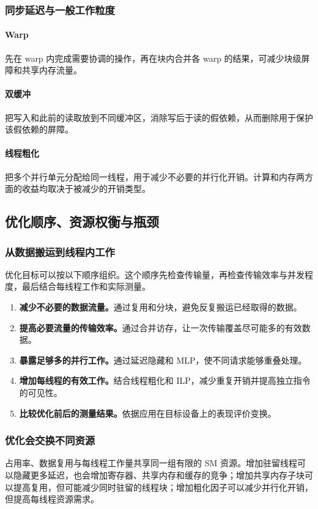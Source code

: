 \subsubsection{同步延迟与一般工作粒度}
\paragraph{Warp }
先在 warp 内完成需要协调的操作，再在块内合并各 warp 的结果，可减少块级屏障和共享内存流量。

\paragraph{双缓冲}
把写入和此前的读取放到不同缓冲区，消除写后于读的假依赖，从而删除用于保护该假依赖的屏障。

\paragraph{线程粗化}
把多个并行单元分配给同一线程，用于减少不必要的并行化开销。计算和内存两方面的收益均取决于被减少的开销类型。

\subsection{优化顺序、资源权衡与瓶颈}
\subsubsection{从数据搬运到线程内工作}
优化目标可以按以下顺序组织。这个顺序先检查传输量，再检查传输效率与并发程度，最后结合每线程工作和实际测量。

\begin{enumerate}[label=\arabic*.,leftmargin=2.1em]
  \item \textbf{减少不必要的数据流量。}通过复用和分块，避免反复搬运已经取得的数据。
  \item \textbf{提高必要流量的传输效率。}通过合并访存，让一次传输覆盖尽可能多的有效数据。
  \item \textbf{暴露足够多的并行工作。}通过延迟隐藏和 MLP，使不同请求能够重叠处理。
  \item \textbf{增加每线程的有效工作。}结合线程粗化和 ILP，减少重复开销并提高独立指令的可见性。
  \item \textbf{比较优化前后的测量结果。}依据应用在目标设备上的表现评价变换。
\end{enumerate}

\subsubsection{优化会交换不同资源}
占用率、数据复用与每线程工作量共享同一组有限的 SM 资源。增加驻留线程可以隐藏更多延迟，也会增加寄存器、共享内存和缓存的竞争；增加共享内存子块可以提高复用，但可能减少同时驻留的线程块；增加粗化因子可以减少并行化开销，但提高每线程资源需求。

